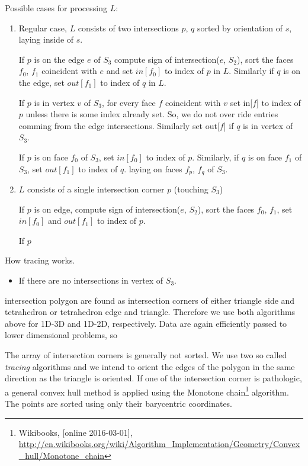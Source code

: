 \documentclass{elsarticle}
\begin{document}
  
Possible cases for processing $L$:
\begin{enumerate}
 \item Regular case, $L$ consists of two intersections $p$, $q$ sorted by orientation of $s$, laying inside of $s$.
 
 If $p$ is on the edge $e$ of $S_3$ compute sign of intersection($e$, $S_2$), sort the faces $f_0$, $f_1$ coincident with $e$
 and set $in[f_0]$ to index of $p$ in $L$. Similarly if $q$ is on the edge, set $out[f_1]$ to index of $q$ in $L$.
 
 If $p$ is in vertex $v$ of $S_3$, for every face $f$ coincident with $v$ set
 in[$f$] to index of $p$ unless there is some index already set. So, we do not over ride
 entries comming from the edge intersections. Similarly set out[$f$] if $q$ is in vertex of $S_3$.
 
 If $p$ is on face $f_0$ of $S_3$, set $in[f_0]$ to index of $p$. Similarly, if $q$ is on face $f_1$ of $S_3$, set $out[f_1]$ to index of $q$.
 laying on faces $f_p$, $f_q$ of $S_3$.
 
 \item $L$ consists of a single intersection corner $p$ (touching $S_3$)
 
 
 If $p$ is on edge, compute sign of intersection($e$, $S_2$), sort the faces $f_0$, $f_1$,
 set $in[f_0]$ and $out[f_1]$ to index of $p$.
 
 If $p$
\end{enumerate}

How tracing works.
\begin{itemize}
 \item If there are no intersections in vertex of $S_3$. 
\end{itemize}

  
  



intersection polygon
are found as intersection corners of either triangle side and tetrahedron or tetrahedron edge and triangle.
Therefore we use both algorithms above for 1D-3D and 1D-2D, respectively. Data are again efficiently passed
to lower dimensional problems, so 

The array of intersection corners is generally not sorted. We use two so called \emph{tracing} algorithms and we
intend to orient the edges of the polygon in the same direction as the triangle is oriented.
If one of the intersection corner is pathologic, a general convex hull method is applied using the Monotone 
chain\footnote{Wikibooks, [online 2016-03-01], 
      \url{http://en.wikibooks.org/wiki/Algorithm_Implementation/Geometry/Convex_hull/Monotone_chain}} 
algorithm. The points are sorted using only their barycentric coordinates.
\end{document}
